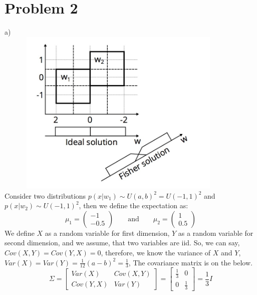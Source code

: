 \documentclass{article}
\begin{document}
\section{Problem 2}
a)\\
\includegraphics[width=12cm, height=8cm]{hm6.jpg}
\\
Consider two distributions $p(x|w_1)\sim U(a,b)^2 = U(-1,1)^2$ and $p(x|w_2) \sim U(-1,1)^2$, then we define the expectation as:
\begin{equation*}
\mu_1=\begin{pmatrix}
         -1 \\
         -0.5 
        \end{pmatrix}
        \qquad \text{and} \qquad
\mu_2 = \begin{pmatrix}
         1 \\
         0.5 
        \end{pmatrix}
\end{equation*}
We define $X$ as a random variable for first dimension, $Y$ as a random variable for second dimension, and we assume, that two variables are iid. So, we can say, $Cov(X,Y)=Cov(Y,X) = 0$, therefore, we know the variance of $X$ and $Y$, $Var(X) = Var(Y) = \frac{1}{12}(a-b)^2 = \frac{1}{3}$, The covariance matrix is on the below.
\begin{equation*}
\Sigma= \begin{bmatrix}
         Var(X) & Cov(X,Y)\\
         Cov(Y,X) &Var(Y)
        \end{bmatrix}
        = \begin{bmatrix}
        \frac{1}{3} & 0\\
        0& \frac{1}{3}
        \end{bmatrix}
        = \frac{1}{3}I
\end{equation*}
\end{document}
